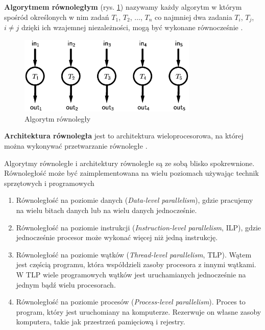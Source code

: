 \begin{definicja}\label{def:algorytm_rownolegly}
\textbf{Algorytmem równoległym} (rys.  \ref{fig:parallel}) nazywamy każdy algorytm w którym spośród określonych w nim zadań \(T_1\), \(T_2\), \(\dots\), \(T_n\) co najmniej dwa zadania \(T_i\), \(T_j\), \(i\neq j\) dzięki ich wzajemnej niezależności, mogą być wykonane równocześnie \cite{APC2011}.\\
\end{definicja}

\begin{figure}[h]
\centering
\includegraphics[width=23em]{./images/Rys1.eps}
\caption{Algorytm równoległy}
\label{fig:parallel}
\end{figure}

\begin{definicja}\label{def:arch_rownolegla}
\textbf{Architektura równoległa} jest to architektura wieloprocesorowa, na której można wykonywać przetwarzanie równoległe \cite{IEEE}.
\end{definicja}

Algorytmy równoległe i architektury równoległe są ze sobą blisko spokrewnione. Równoległość może być zaimplementowana na wielu poziomach używając technik sprzętowych i programowych\cite{APC2011}
\begin{enumerate}
\item{Równoległość na poziomie danych (\emph{Data-level parallelism}), gdzie pracujemy na wielu bitach danych lub na wielu danych jednocześnie.}
\item{Równoległość na poziomie instrukcji (\emph{Instruction-level parallelism}, ILP), gdzie jednocześnie procesor może wykonać więcej niż jedną instrukcję.}
\item{Równoległość na poziomie wątków (\emph{Thread-level parallelism}, TLP). Wątem jest częścią programu, która współdzieli zasoby procesora z innymi wątkami. W TLP wiele programowych wątków jest uruchamianych jednocześnie na jednym bądź wielu procesorach.}
\item{Równoległość na poziomie procesów (\emph{Process-level parallelism}). Proces to program, który jest uruchomiany na komputerze. Rezerwuje on własne zasoby komputera, takie jak przestrzeń pamięciową i rejestry.}
\end{enumerate}

